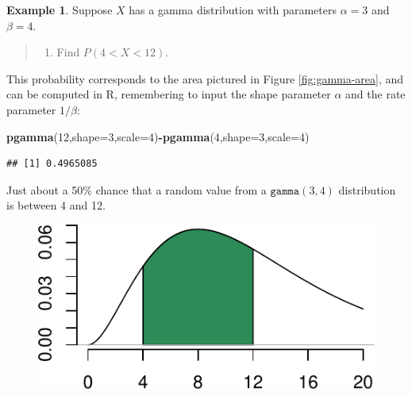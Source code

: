 \documentclass[
]{book}
\newenvironment{Shaded}{\begin{snugshade}}{\end{snugshade}}
\newcommand{\AttributeTok}[1]{\textcolor[rgb]{0.13,0.29,0.53}{#1}}
\newcommand{\DecValTok}[1]{\textcolor[rgb]{0.00,0.00,0.81}{#1}}
\newcommand{\FunctionTok}[1]{\textcolor[rgb]{0.13,0.29,0.53}{\textbf{#1}}}
\newcommand{\NormalTok}[1]{#1}
\newcommand{\SpecialCharTok}[1]{\textcolor[rgb]{0.81,0.36,0.00}{\textbf{#1}}}
\providecommand{\tightlist}{%
  \setlength{\itemsep}{0pt}\setlength{\parskip}{0pt}}
\theoremstyle{definition}
\theoremstyle{definition}
\newtheorem{example}{Example}[chapter]
\theoremstyle{definition}
\theoremstyle{definition}
\theoremstyle{remark}
\begin{document}
\begin{example}
\protect\hypertarget{exm:gamma-R}{}\label{exm:gamma-R}Suppose \(X\) has a gamma distribution with parameters \(\alpha=3\) and \(\beta = 4\).

\begin{quote}
\begin{enumerate}
\def\labelenumi{\alph{enumi})}
\tightlist
\item
  Find \(P(4 < X < 12)\).
\end{enumerate}
\end{quote}

This probability corresponds to the area pictured in Figure \ref{fig:gamma-area}, and can be computed in R, remembering to input the shape parameter \(\alpha\) and the rate parameter \(1/\beta\):

\begin{Shaded}
\begin{Highlighting}[]
\FunctionTok{pgamma}\NormalTok{(}\DecValTok{12}\NormalTok{,}\AttributeTok{shape=}\DecValTok{3}\NormalTok{,}\AttributeTok{scale=}\DecValTok{4}\NormalTok{)}\SpecialCharTok{{-}}\FunctionTok{pgamma}\NormalTok{(}\DecValTok{4}\NormalTok{,}\AttributeTok{shape=}\DecValTok{3}\NormalTok{,}\AttributeTok{scale=}\DecValTok{4}\NormalTok{)}
\end{Highlighting}
\end{Shaded}

\begin{verbatim}
## [1] 0.4965085
\end{verbatim}

Just about a 50\% chance that a random value from a \(\texttt{gamma}(3,4)\) distribution is between 4 and 12.

\begin{figure}

{\centering \includegraphics{math340-notes_files/figure-latex/gamma-area-1} 

}


\end{figure}
\end{example}
\end{document}
